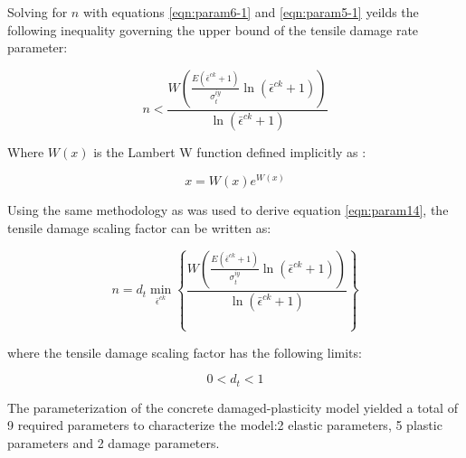 Solving for $n$ with equations \ref{eqn:param6-1} and \ref{eqn:param5-1} yeilds the following inequality governing the upper bound of the tensile damage rate parameter:

\begin{equation}
n<\frac{W\left(\frac{E\left(\bar{\epsilon}^{ck}+1\right)}{\sigma_{t}^{iy}}\ln\left(\bar{\epsilon}^{ck}+1\right)\right)}{\ln\left(\bar{\epsilon}^{ck}+1\right)}\label{eqn:param7}
\end{equation}

Where $W\left(x\right)$ is the Lambert W function defined implicitly as \cite{Corless_1996}:

\begin{equation}
x=W\left(x\right)e^{W(x)}\label{eqn:param8}
\end{equation}

Using the same methodology as was used to derive equation \ref{eqn:param14}, the tensile damage scaling factor can be written as:


\begin{equation}
n=d_{t}\min_{\bar{\epsilon}^{ck}}\left\{\frac{W\left(\frac{E\left(\bar{\epsilon}^{ck}+1\right)}{\sigma_{t}^{iy}}\ln\left(\bar{\epsilon}^{ck}+1\right)\right)}{\ln\left(\bar{\epsilon}^{ck}+1\right)}\right\}
\label{eqn:param9}
\end{equation}


where the tensile damage scaling factor has the following limits:

\begin{equation}
0<d_{t}<1\label{eqn:param10}
\end{equation}

The parameterization of the concrete damaged-plasticity model yielded a total of 9 required parameters to characterize the model:2 elastic parameters, 5 plastic parameters and 2 damage parameters. 
